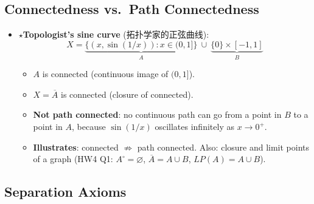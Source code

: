 \documentclass{article}
\newcommand{\starKey}{\textcolor{red!65!black}{\textbf{$\star$}}}
\begin{document}
\subsection{Connectedness vs.\ Path Connectedness}

\begin{itemize}
  \item \starKey \textbf{Topologist's sine curve} (拓扑学家的正弦曲线):
  \[
    X = \underbrace{\{(x,\sin(1/x)) : x\in(0,1]\}}_{A}\ \cup\
        \underbrace{\{0\}\times[-1,1]}_{B}
  \]
  \begin{itemize}
    \item $A$ is connected (continuous image of $(0,1]$).
    \item $X=\overline{A}$ is connected (closure of connected).
    \item \textbf{Not path connected}: no continuous path can go from a point in $B$
    to a point in $A$, because $\sin(1/x)$ oscillates infinitely as $x\to0^+$.
    \item \textbf{Illustrates}: connected $\nRightarrow$ path connected.
    Also: closure and limit points of a graph (HW4 Q1: $A^\circ=\varnothing$,
    $\overline{A}=A\cup B$, $LP(A)=A\cup B$).
  \end{itemize}
\end{itemize}

\subsection{Separation Axioms}
\end{document}
